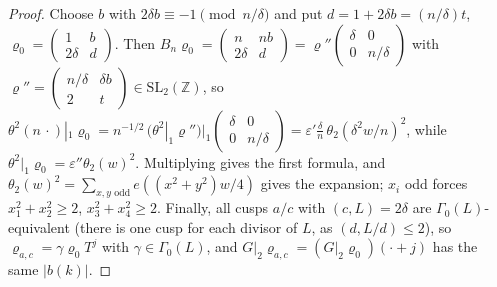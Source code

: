 ﻿\documentclass[11pt]{amsart}
\theoremstyle{remark}
\newcommand{\Z}{\mathbb{Z}}
\newcommand{\e}{\varepsilon}
\begin{document}
\begin{proof}
Choose $b$ with $2\delta b\equiv-1\pmod{n/\delta}$ and put $d=1+2\delta b=(n/\delta)t$, $\varrho_0=\left(\begin{smallmatrix}1&b\\2\delta&d\end{smallmatrix}\right)$. Then $B_n\varrho_0=\left(\begin{smallmatrix}n&nb\\2\delta&d\end{smallmatrix}\right)=\varrho''\left(\begin{smallmatrix}\delta&0\\0&n/\delta\end{smallmatrix}\right)$ with $\varrho''=\left(\begin{smallmatrix}n/\delta&\delta b\\2&t\end{smallmatrix}\right)\in\mathrm{SL}_2(\Z)$, so $\theta^2(n\,\cdot)|_1\varrho_0=n^{-1/2}\,(\theta^2|_1\varrho'')|_1\left(\begin{smallmatrix}\delta&0\\0&n/\delta\end{smallmatrix}\right)=\e'\frac\delta n\,\theta_2(\delta^2w/n)^2$, while $\theta^2|_1\varrho_0=\e''\theta_2(w)^2$. Multiplying gives the first formula, and $\theta_2(w)^2=\sum_{x,y\text{ odd}}e((x^2+y^2)w/4)$ gives the expansion; $x_i$ odd forces $x_1^2+x_2^2\ge2$, $x_3^2+x_4^2\ge2$. Finally, all cusps $a/c$ with $(c,L)=2\delta$ are $\Gamma_0(L)$-equivalent (there is one cusp for each divisor of $L$, as $(d,L/d)\le2$), so $\varrho_{a,c}=\gamma\varrho_0T^j$ with $\gamma\in\Gamma_0(L)$, and $G|_2\varrho_{a,c}=(G|_2\varrho_0)(\cdot+j)$ has the same $|b(k)|$.
\end{proof}
\end{document}
